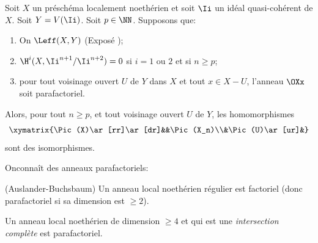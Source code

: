 \begin{proposition} \label{XI.3.12}
Soit $X$ un pr\'esch\'ema localement noeth\'erien et soit $\Ii$ un id\'eal quasi-coh\'erent de $X$. Soit $Y=V(\Ii)$. Soit $p\in\NN$. Supposons que:
\begin{enumerate}
\item[1)] On  $\Leff(X, Y)$ (\textup{Expos\'e} );
\item[2)] $\H^i(X, \Ii^{n+1}/\Ii^{n+2})=0$ si $i=1$ ou $2$ et si $n\geq p$;
\item[3)] pour tout voisinage ouvert $U$ de $Y$ dans $X$ et tout $x\in X-U$, l'anneau $\OXx$ soit parafactoriel.
\end{enumerate}
\noindent
Alors, pour tout $n\geq p$, et tout voisinage ouvert $U$ de $Y$, les homomorphismes
\[
\xymatrix{\Pic(X)\ar[rr]\ar[dr]&&\Pic(X_n)\\&\Pic(U)\ar[ur]&}
\]
sont des isomorphismes.
\end{proposition}

On\pageoriginale conna\^it des anneaux parafactoriels:

\skpt
\begin{theoreme} \label{XI.3.13}
\begin{enumeratei}
\item
(Auslander-Buchsbaum) Un anneau local noeth\'erien r\'egulier est factoriel (donc parafactoriel si sa dimension est $\geq 2$).
\item
Un anneau local noeth\'erien de dimension $\geq 4$ et qui est une \emph{intersection compl\`ete} est parafactoriel.
\end{enumeratei}
\end{theoreme}

